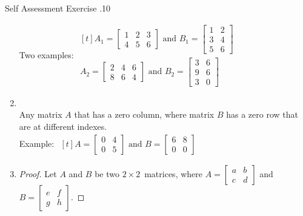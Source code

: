 \documentclass[\main/notes.tex]{subfiles}
\begin{document}
\begin{exercise}{Self Assessment Exercise \thechapter.10}
\begin{enumerate}
							Two examples: \quad
							$ \begin{aligned}[t]
								A_{1} = \begin{bmatrix}
									1 & 2 & 3\\
									4 & 5 & 6
								\end{bmatrix} \text{ and }
								B_{1} = \begin{bmatrix}
									1 & 2\\
									3 & 4\\
									5 & 6
								\end{bmatrix}\\
								A_{2} = \begin{bmatrix}
									2 & 4 & 6\\
									8 & 6 & 4
								\end{bmatrix} \text{ and }
								B_{2} = \begin{bmatrix}
									3 & 6\\
									9 & 6\\
									3 & 0
								\end{bmatrix}
							\end{aligned} $
						\item {}\\
							Any matrix $A$ that has a zero column, where matrix $B$ has a zero row that are at different indexes.\\
							Example: \quad $
							\begin{aligned}[t]
								A = \begin{bmatrix}
									0 & 4\\
									0 & 5
								\end{bmatrix} \text{ and }
								B = \begin{bmatrix}
									6 & 8\\
									0 & 0
								\end{bmatrix}
							\end{aligned}$
						\pagebreak
						\item {}
							\begin{proof}
								Let $A$ and $B$ be two $2 \times 2$~matrices, where $A = \begin{bmatrix}a & b\\ c & d\end{bmatrix}$ and $B = \begin{bmatrix}e & f\\g & h\end{bmatrix}$.

\end{proof}
\end{enumerate}
\end{exercise}
\end{document}
